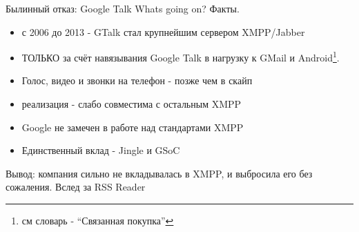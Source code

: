 {
\begin{frame}{Былинный отказ: Google Talk}
  \alert{Whats going on? Факты.}

  \begin{itemize}
    \item с 2006 до 2013 - GTalk стал крупнейшим сервером XMPP/Jabber
    \item \alert{ТОЛЬКО} за счёт навязывания Google Talk в нагрузку к GMail и Android\footnote{см словарь - ``Связанная покупка''}. \pause
    \item Голос, видео и звонки на телефон - позже чем в скайп
    \item реализация - слабо совместима с остальным XMPP \pause
    \item Google не замечен в работе над стандартами XMPP
    \item Единственный вклад - Jingle и GSoC
  \end{itemize}
  \pause
  \alert{Вывод: компания сильно не вкладывалась в XMPP, и выбросила его без сожаления. Вслед за RSS Reader}

\end{frame}
}

